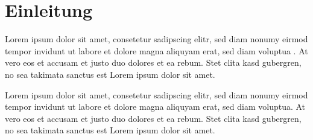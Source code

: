 %
%
%
\section{Einleitung\label{000template:section:einleitung}}
Lorem ipsum dolor sit amet, consetetur sadipscing elitr, sed diam
nonumy eirmod tempor invidunt ut labore et dolore magna aliquyam
erat, sed diam voluptua \cite{000template:bibtex}.
At vero eos et accusam et justo duo dolores et ea rebum.
Stet clita kasd gubergren, no sea takimata sanctus est Lorem ipsum
dolor sit amet.

Lorem ipsum dolor sit amet, consetetur sadipscing elitr, sed diam
nonumy eirmod tempor invidunt ut labore et dolore magna aliquyam
erat, sed diam voluptua.
At vero eos et accusam et justo duo dolores et ea rebum.  Stet clita
kasd gubergren, no sea takimata sanctus est Lorem ipsum dolor sit
amet.


